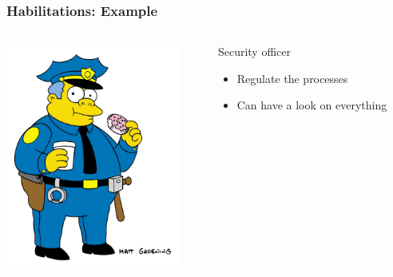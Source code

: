 \documentclass{beamer}
\begin{document}
\begin{frame}
\frametitle{Habilitations: Example}
\begin{columns}
 \begin{column}{0.45\textwidth}
         \includegraphics[height=7.5cm]{./pics/simpsons/police_Wiggum_Clancy.png}
 \end{column}
 \begin{column}{0.45\textwidth}
    \begin{block}{Security officer}
        \begin{itemize}
            \item Regulate the processes
            \item Can have a look on everything 
        \end{itemize}
    \end{block}
 \end{column}
\end{columns}
\end{frame}
\end{document}
